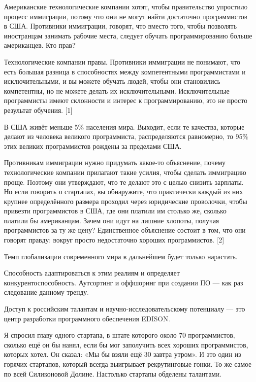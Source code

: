 \documentclass[ebook,12pt,oneside,openany]{memoir}
\begin{document}
\maketitle

Американские технологические компании хотят, чтобы правительство
упростило процесс иммиграции, потому что они не могут найти достаточно
программистов в США. Противники иммиграции, говорят, что вместо того,
чтобы позволять иностранцам занимать рабочие места, следует обучать
программированию больше американцев. Кто прав?

Технологические компании правы. Противники иммиграции не понимают, что
есть большая разница в способностях между компетентными программистами
и исключительными, и вы можете обучать людей, чтобы они становились
компетентны, но не можете делать их исключительными. Исключительные
программисты имеют склонности и интерес к программированию, это не
просто результат обучения. [1]

В США живёт меньше 5\% населения мира. Выходит, если те качества,
которые делают из человека великого программиста, распределяются
равномерно, то 95\% этих великих программистов рождены за пределами
США.

Противникам иммиграции нужно придумать какое-то объяснение, почему
технологические компании прилагают такие усилия, чтобы сделать
иммиграцию проще. Поэтому они утверждают, что те делают это с целью
снизить зарплаты. Но если говорить о стартапах, вы обнаружите, что
практически каждый из них крупнее определённого размера проходил через
юридические проволочки, чтобы привезти программистов в США, где они
платили им столько же, сколько платили бы американцам. Зачем они идут
на лишние хлопоты, получая программистов за ту же цену? Единственное
объяснение состоит в том, что они говорят правду: вокруг просто
недостаточно хороших программистов. [2]

Темп глобализации современного мира в дальнейшем будет только
нарастать.


Способность адаптироваться к этим реалиям и определяет
конкурентоспособность. Аутсортинг и оффшоринг при создании ПО — как
раз следование данному тренду.

Доступ к российским талантам и научно-исследовательскому потенциалу —
это центр разработки программного обеспечения EDISON.



Я спросил главу одного стартапа, в штате которого около 70
программистов, сколько ещё он бы нанял, если бы мог заполучить всех
хороших программистов, которых хотел. Он сказал: «Мы бы взяли ещё 30
завтра утром». И это один из горячих стартапов, который всегда
выигрывает рекрутинговые гонки. То же самое по всей Силиконовой
Долине. Настолько стартапы обделены талантами.
\end{document}
